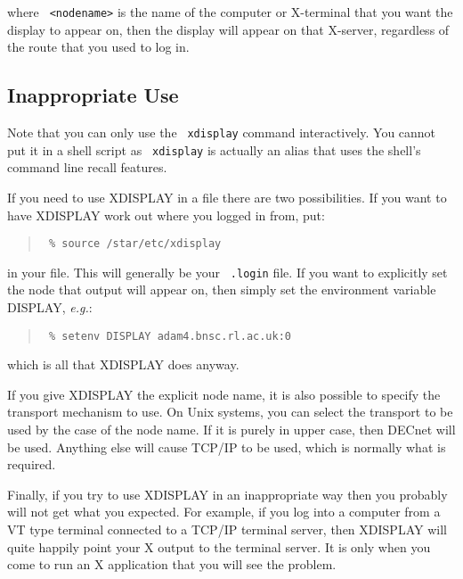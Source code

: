 \documentclass[twoside,11pt]{article}
\newcommand{\xlabel}[1]{}
\renewcommand{\_}{\texttt{\symbol{95}}}
\begin{document}
where \texttt{ <nodename>} is the name of the computer or X-terminal that
you want the display to appear on, then the display will appear on that
X-server, regardless of the route that you used to log in.

\subsection{\label{inappropriate}\xlabel{inappropriate}Inappropriate Use}

Note that you can only use the \texttt{ xdisplay} command interactively.  You
cannot put it in a shell script as \texttt{ xdisplay} is actually an alias
that uses the shell's command line recall features.

If you need to use XDISPLAY in a file there are two possibilities.  If
you want to have XDISPLAY work out where you logged in from, put:

\begin{quote}\texttt{
\% source /star/etc/xdisplay
}
\end{quote}

in your file. This will generally be your \texttt{ .login} file. If you want to
explicitly set the node that output will appear on, then simply set the
environment variable DISPLAY, \emph{e.g.}:

\begin{quote}\texttt{
\% setenv DISPLAY adam4.bnsc.rl.ac.uk:0
}
\end{quote}

which is all that XDISPLAY does anyway.

If you give XDISPLAY the explicit node name, it is also possible to
specify the transport mechanism to use.  On Unix systems, you can
select the transport to be used by the case of the node name.  If it is
purely in upper case, then DECnet will be used.  Anything else will
cause TCP/IP to be used, which is normally what is required.

Finally, if you try to use XDISPLAY in an inappropriate way then you
probably will not get what you expected.  For example, if you log into a
computer from a VT type terminal connected to a TCP/IP terminal server,
then XDISPLAY will quite happily point your X output to the terminal
server. It is only when you come to run an X application that you will
see the problem.
\end{document}
